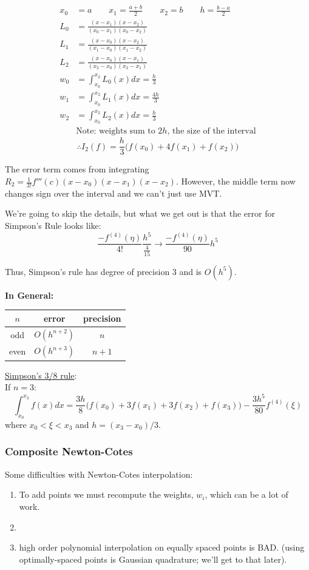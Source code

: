 \documentclass[12pt, answers]{exam}
\begin{document}
\begin{align*}
x_0 &= a \qquad x_1 = \frac{a+b}{2} \qquad x_2=b \qquad h=\frac{b-a}{2}\\
%
L_0 &= \frac{(x-x_1)(x-x_2)}{(x_0-x_1)(x_0-x_2)}\\
L_1 &= \frac{(x-x_0)(x-x_2)}{(x_1-x_0)(x_1-x_2)}\\
L_2 &= \frac{(x-x_0)(x-x_1)}{(x_2-x_0)(x_2-x_1)}\\
%
w_0 &= \int_{x_0}^{x_2} L_0(x)dx = \frac{h}{3}\\
w_1 &= \int_{x_0}^{x_2} L_1(x)dx = \frac{4h}{3}\\
w_2 &= \int_{x_0}^{x_2} L_2(x)dx = \frac{h}{3}\\
&\text{Note: weights sum to }2h\text{, the size of the interval}\nonumber
\end{align*}
\ifprintanswers
\[\therefore I_2(f) = \frac{h}{3}\bigl(f(x_0) + 4f(x_1) + f(x_2)\bigr) \]
\else
\vspace*{2em}
\fi
 
The error term comes from integrating $R_2 = \frac{1}{3!}f'''(c)(x-x_0)(x-x_1)(x-x_2)$. However, the middle term now changes sign over the interval and we can't just use MVT.

We're going to skip the details, but what we get out is that the error for Simpson's Rule looks like:
\[\frac{-f^{(4)}(\eta)}{4!}\frac{h^5}{\frac{4}{15}} \rightarrow \boxed{\frac{-f^{(4)}(\eta)}{90}h^5}\]

Thus, Simpson's rule has degree of precision 3 and is $O(h^5)$.

\textbf{In General:}
\vspace*{-1em}
\begin{center}
\begin{tabular}{c c c}
$n$  & error        & precision \\ \hline
odd  & $O(h^{n+2})$ & $n$ \\
even & $O(h^{n+3})$ & $n+1$ \\
\end{tabular}
\end{center}

\underline{Simpson's 3/8 rule}:\\
If $n=3$:
\[\int_{x_0}^{x_3} f(x)dx = \frac{3h}{8}\bigl(f(x_0) + 3f(x_1) + 3f(x_2) + f(x_3)\bigr) - \frac{3h^5}{80}f^{(4)}(\xi)\]
where $x_0 < \xi < x_3$ and $h=(x_3 - x_0)/3$.

\subsubsection*{Composite Newton-Cotes}
Some difficulties with Newton-Cotes interpolation:
\begin{enumerate}
\ifprintanswers
\item To add points we must recompute the weights, $w_i$, which can be a lot of work.
\else
\item\fi
\item high order polynomial interpolation on equally spaced points is BAD. (using optimally-spaced points is Gaussian quadrature; we'll get to that later).
\end{enumerate}
\end{document}
